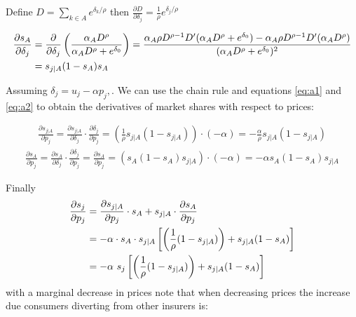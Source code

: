 \documentclass[12pt]{article}
\theoremstyle{plain}
\theoremstyle{plain}
\begin{document}
Define $D= \sum_{k\in A} e^{\delta_k/\rho}$ then $\frac{\partial D}{\partial \delta_j} =\frac{1}{\rho} e^{\delta_j/\rho} $

\begin{align}\label{eq:a2}
\frac{\partial s_A}{\partial \delta_j} &=
\frac{\partial}{\partial \delta_j}\left(\frac{\alpha_A D^\rho}{\alpha_A D^\rho + e^{\delta_0}}  \right) 
= \frac{\alpha_A \rho D^{\rho-1} D' (\alpha_A D^\rho + e^{\delta_0})-\alpha_A \rho D^{\rho-1} D' (\alpha_A D^\rho)}{(\alpha_A D^\rho + e^{\delta_0})^2} \notag \\ 
&= s_{j\mid A}  (1-s_A)s_A 
\end{align}


Assuming $\delta_j = u_j - \alpha p_j, $. We can use the chain rule and equations \ref{eq:a1} and \ref{eq:a2} to obtain the derivatives of market shares with respect to prices: 

\begin{align}\label{eq:a3}
     \frac{\partial s_{j|A}}{\partial p_j} = \frac{\partial s_{j|A}}{\partial \delta_j} \cdot \frac{\partial \delta_j}{\partial p_j} = \left(\frac{1}{\rho}s_{j|A}(1-s_{j|A})\right) \cdot (-\alpha) = -\frac{\alpha}{\rho}s_{j|A}(1-s_{j|A})
\end{align}
\begin{align}\label{eq:a4}
    \frac{\partial s_A}{\partial p_j} = \frac{\partial s_A}{\partial \delta_j} \cdot \frac{\partial \delta_j}{\partial p_j} = \frac{\partial s_A}{\partial p_j} = (s_A(1-s_A)s_{j|A}) \cdot (-\alpha) = -\alpha s_A(1-s_A)s_{j|A}    
\end{align}

Finally 
\begin{align}\label{eq:a5}
    \frac{\partial s_j}{\partial p_j} &= \frac{\partial s_{j|A}}{\partial p_j} \cdot s_A + s_{j|A} \cdot \frac{\partial s_A}{\partial p_j} \notag \\
    &= -\alpha \cdot s_A \cdot s_{j|A}\left[ \left(\frac{1}{\rho}(1-s_{j|A})\right)  + s_{j|A}  (1-s_A) \right] \notag \\
    &= -\alpha \ s_j \left[ \left(\frac{1}{\rho}(1-s_{j|A})\right)  + s_{j|A}  (1-s_A) \right]  
\end{align}
with a marginal decrease in prices 
note that when decreasing prices the increase due consumers diverting from other insurers is: 
\end{document}
